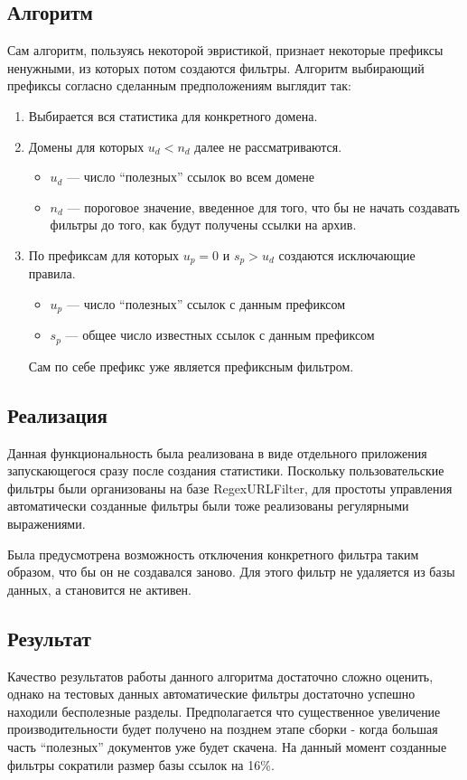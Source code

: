 \subsection{Алгоритм}
Сам алгоритм, пользуясь некоторой эвристикой, признает некоторые префиксы ненужными, из которых потом создаются фильтры.
Алгоритм выбирающий префиксы согласно сделанным предположениям выглядит так:
\begin{enumerate}
 \item Выбирается вся статистика для конкретного домена.
 \item Домены для которых $u_{d}<n_{d}$ далее не рассматриваются.
 \begin{itemize}
  \item $u_{d}$ --- число ``полезных'' ссылок во всем домене
  \item $n_{d}$ --- пороговое значение, введенное для того, что бы не начать создавать фильтры до того, как будут получены ссылки на архив.
 \end{itemize}

 \item По префиксам для которых $u_{p}=0$ и $s_{p}>u_{d}$ создаются исключающие правила.
 \begin{itemize}
  \item $u_{p}$ --- число ``полезных'' ссылок с данным префиксом
  \item $s_{p}$ --- общее число известных ссылок с данным префиксом
 \end{itemize}
 Сам по себе префикс уже является префиксным фильтром.
\end{enumerate}


\subsection{Реализация}
Данная функциональность была реализована в виде отдельного приложения запускающегося сразу после создания статистики. Поскольку пользовательские фильтры были организованы на базе RegexURLFilter, для простоты управления автоматически созданные фильтры были тоже реализованы регулярными выражениями. 

Была предусмотрена возможность отключения конкретного фильтра таким образом, что бы он не создавался заново. Для этого фильтр не удаляется из базы данных, а становится не активен.

\subsection{Результат}
Качество результатов работы данного алгоритма достаточно сложно оценить, однако на тестовых данных автоматические фильтры достаточно успешно находили бесполезные разделы. Предполагается что существенное увеличение производительности будет получено на позднем этапе сборки - когда большая часть ``полезных'' документов уже будет скачена. На данный момент созданные фильтры сократили размер базы ссылок на 16\%.
